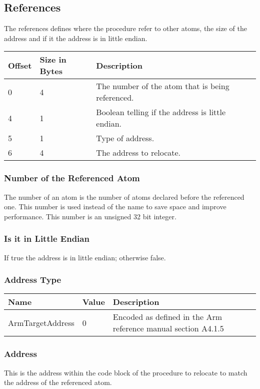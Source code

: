 \subsection{References}
The references defines where the procedure refer to other atoms, the size of the 
address and if it the address is in little endian.

\begin{table}[h]
    \centering
    \label{tbl:reference}
    \begin{tabular}{|l|l|l|}
        \hline
        \textbf{Offset} & \textbf{Size in Bytes} & \textbf{Description}                             \\ \hline
        0               & 4                      & The number of the atom that is being referenced. \\ \hline
        4               & 1                      & Boolean telling if the address is little endian. \\ \hline
        5               & 1                      & Type of address.                                 \\ \hline
        6               & 4                      & The address to relocate.                         \\ \hline
    \end{tabular}
\end{table}

\subsubsection{Number of the Referenced Atom}
The number of an atom is the number of atoms declared before the referenced one.
This number is used instead of the name to save space and improve performance. 
This number is an unsigned 32 bit integer.

\subsubsection{Is it in Little Endian}
If true the address is in little endian; otherwise false.

\subsubsection{Address Type}
\begin{table}[h]
    \centering
    \begin{tabular}{|l|l|l|}
        \hline
        \textbf{Name}    & \textbf{Value} & \textbf{Description}                                          \\ \hline
        ArmTargetAddress & 0              & Encoded as defined in the Arm reference manual section A4.1.5 \\ \hline
    \end{tabular}
\end{table}

\subsubsection{Address}
This is the address within the code block of the procedure to relocate to match
the address of the referenced atom.